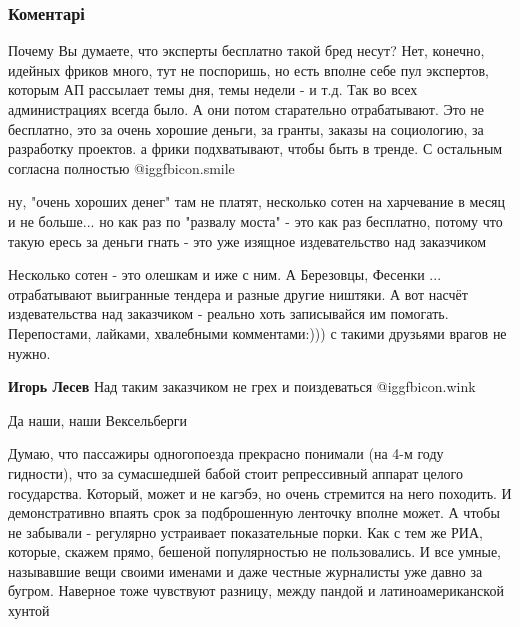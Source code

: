  
 
 
 
 
\subsubsection{Коментарі}
\label{sec:15_05_2018.fb.lesev_igor.1.vudu.cmt}

\begin{itemize} %

Почему Вы думаете, что эксперты бесплатно такой бред несут? Нет, конечно,
идейных фриков много, тут не поспоришь, но есть вполне себе пул экспертов,
которым АП рассылает темы дня, темы недели - и т.д. Так во всех администрациях
всегда было. А они потом старательно отрабатывают. Это не бесплатно, это за
очень хорошие деньги, за гранты, заказы на социологию, за разработку проектов.
а фрики подхватывают, чтобы быть в тренде. С остальным согласна полностью  @igg{fbicon.smile} 

\begin{itemize} %

ну, "очень хороших денег" там не платят, несколько сотен на харчевание в месяц
и не больше... но как раз по "развалу моста" - это как раз бесплатно, потому
что такую ересь за деньги гнать - это уже изящное издевательство над заказчиком


Несколько сотен - это олешкам и иже с ним. А Березовцы, Фесенки ...
отрабатывают выигранные тендера и разные другие ништяки. А вот насчёт
издевательства над заказчиком - реально хоть записывайся им помогать.
Перепостами, лайками, хвалебными комментами:))) с такими друзьями врагов не
нужно.

\textbf{Игорь Лесев} Над таким заказчиком не грех и поиздеваться  @igg{fbicon.wink} 
\end{itemize} %

Да наши, наши Вексельберги


Думаю, что пассажиры одногопоезда прекрасно понимали (на 4-м году гидности),
что за сумасшедшей бабой стоит репрессивный аппарат целого государства.
Который, может и не кагэбэ, но очень стремится на него походить. И
демонстративно впаять срок за подброшенную ленточку вполне может. А чтобы не
забывали - регулярно устраивает показательные порки. Как с тем же РИА, которые,
скажем прямо, бешеной популярностью не пользовались. И все умные, называвшие
вещи своими именами и даже честные журналисты уже давно за бугром. Наверное
тоже чувствуют разницу, между пандой и латиноамериканской хунтой


\end{itemize}
